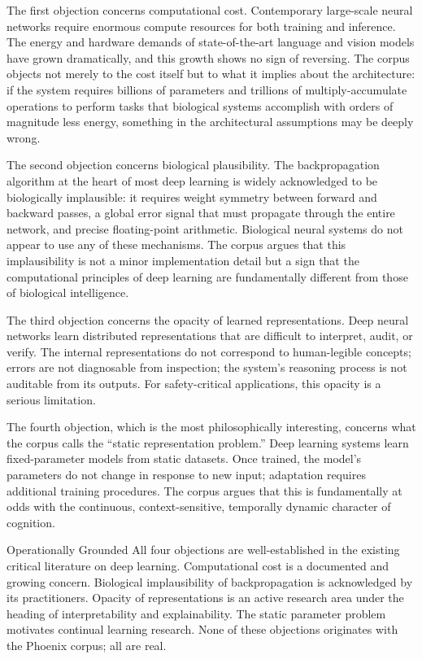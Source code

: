 The first objection concerns computational cost. Contemporary
large-scale neural networks require enormous compute resources
for both training and inference. The energy and hardware demands
of state-of-the-art language and vision models have grown
dramatically, and this growth shows no sign of reversing. The
corpus objects not merely to the cost itself but to what it
implies about the architecture: if the system requires billions
of parameters and trillions of multiply-accumulate operations
to perform tasks that biological systems accomplish with orders
of magnitude less energy, something in the architectural
assumptions may be deeply wrong.

The second objection concerns biological plausibility. The
backpropagation algorithm at the heart of most deep learning
is widely acknowledged to be biologically implausible: it
requires weight symmetry between forward and backward passes,
a global error signal that must propagate through the entire
network, and precise floating-point arithmetic. Biological
neural systems do not appear to use any of these mechanisms.
The corpus argues that this implausibility is not a minor
implementation detail but a sign that the computational
principles of deep learning are fundamentally different from
those of biological intelligence.

The third objection concerns the opacity of learned
representations. Deep neural networks learn distributed
representations that are difficult to interpret, audit, or
verify. The internal representations do not correspond to
human-legible concepts; errors are not diagnosable from
inspection; the system's reasoning process is not auditable
from its outputs. For safety-critical applications, this
opacity is a serious limitation.

The fourth objection, which is the most philosophically
interesting, concerns what the corpus calls the ``static
representation problem.'' Deep learning systems learn
fixed-parameter models from static datasets. Once trained,
the model's parameters do not change in response to new
input; adaptation requires additional training procedures.
The corpus argues that this is fundamentally at odds with
the continuous, context-sensitive, temporally dynamic
character of cognition.

\begin{epistemicstatus}{Operationally Grounded}
All four objections are well-established in the existing
critical literature on deep learning. Computational cost
is a documented and growing concern. Biological implausibility
of backpropagation is acknowledged by its practitioners.
Opacity of representations is an active research area under
the heading of interpretability and explainability.
The static parameter problem motivates continual learning
research. None of these objections originates with the
Phoenix corpus; all are real.
\end{epistemicstatus}

